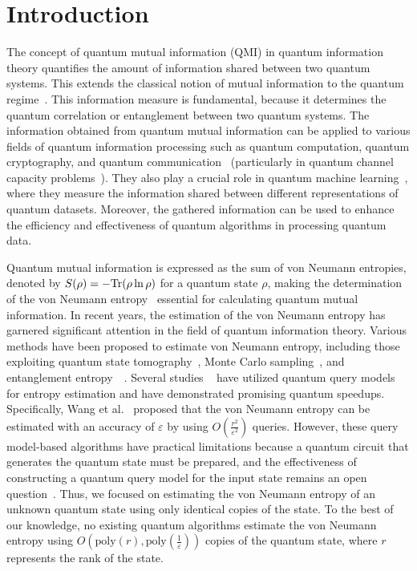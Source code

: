 \documentclass[aps,groupedaddress,superscriptaddress,amssymb,amsmath,amsbsy,amsfonts,twocolumn,pra]{revtex4}
\begin{document}
\maketitle

\section{\label{sec:Introduction}Introduction}
The concept of quantum mutual information (QMI) in quantum information theory quantifies the amount of information shared between two quantum systems. This extends the classical notion of mutual information to the quantum regime~\cite{J07,NC00,W13}. This information measure is fundamental, because it determines the quantum correlation or entanglement between two quantum systems. The information obtained from quantum mutual information can be applied to various fields of quantum information processing such as quantum computation, quantum cryptography, and quantum communication~\cite{NC00,W13} (particularly in quantum channel capacity problems~\cite{BS04,H20}). They also play a crucial role in quantum machine learning~\cite{BWP+17,CCC+19}, where they measure the information shared between different representations of quantum datasets. Moreover, the gathered information can be used to enhance the efficiency and effectiveness of quantum algorithms in processing quantum data.

Quantum mutual information is expressed as the sum of von Neumann entropies, denoted by $S(\rho)=-{\textnormal{Tr}}(\rho\ln\rho)$ for a quantum state $\rho$, making the determination of the von Neumann entropy~\cite{BZ17} essential for calculating quantum mutual information. In recent years, the estimation of the von Neumann entropy has garnered significant attention in the field of quantum information theory. Various methods have been proposed to estimate von Neumann entropy, including those exploiting quantum state tomography~\cite{OW16}, Monte Carlo sampling~\cite{HGKM10}, and entanglement entropy~\cite{CCD09}~\cite{GHS21, AISW20, TV21, WZW22, WGL+22, GL19, SH21}. Several studies ~\cite{WGL+22, GL19, SH21} have utilized quantum query models for entropy estimation and have demonstrated promising quantum speedups. Specifically, Wang et al.~\cite{WGL+22} proposed that the von Neumann entropy can be estimated with an accuracy of $\varepsilon$ by using $O(\frac{r^2}{\varepsilon^2})$ queries. However, these query model-based algorithms have practical limitations because a quantum circuit that generates the quantum state must be prepared, and the effectiveness of constructing a quantum query model for the input state remains an open question~\cite{WZW22}. Thus, we focused on estimating the von Neumann entropy of an unknown quantum state using only identical copies of the state. To the best of our knowledge, no existing quantum algorithms estimate the von Neumann entropy using $O(\text{poly}(r), \text{poly}(\frac{1}{\varepsilon}))$ copies of the quantum state, where $r$ represents the rank of the state.
\end{document}
